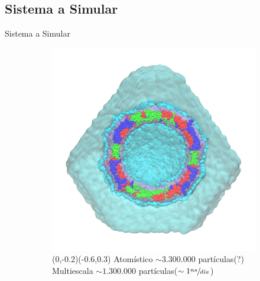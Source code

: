 \documentclass[8pt]{beamer}
\begin{document}
\subsection{Sistema a Simular}
\begin{frame}[t]{Sistema a Simular}

\begin{figure}[ht]
\vspace{-0.4cm}
\centering
\hspace*{\fill}
\begin{subfigure}[t]{.48\textwidth}
  \centering
  \includegraphics[width=1\textwidth]{Figure/TrV_Capsid_WaterBox.png}
  \vspace{-1cm}
  \caption*{
  (0,-0.2)(-0.6,0.3)
  \footnotesize{Atomístico $\sim3.300.000$ partículas(?) \\ Multiescala $\sim1.300.000$ partículas($\sim1\sfrac{ns}{d\acute{\imath}a}$)}
  }
  \label{fig:trv_capsid_waterbox}
\end{subfigure}
\hspace*{\fill}
\begin{subfigure}[t]{.48\textwidth}
  \centering

\end{subfigure}
\end{figure}
\end{frame}
\end{document}
